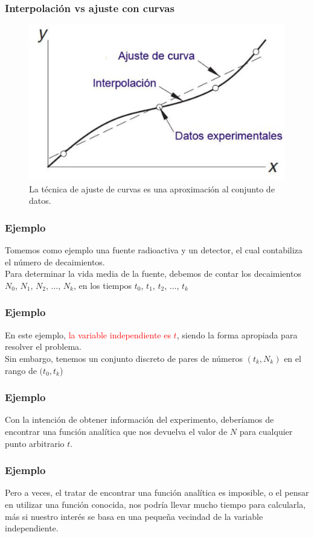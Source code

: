 \begin{frame}[fragile]
\frametitle{Interpolación vs ajuste con curvas}
\begin{figure}
\centering
\includegraphics[scale=0.55]{Imagenes/Interpol03.eps}
\caption{La técnica de ajuste de curvas es una aproximación al conjunto de datos.}
\end{figure}
\end{frame}
\begin{frame}
\frametitle{Ejemplo}
Tomemos como ejemplo una fuente radioactiva y un detector, el cual contabiliza el número de decaimientos.
\\
\bigskip
Para determinar la vida media de la fuente, debemos de contar los decaimientos $N_{0}$, $N_{1}$, $N_{2}$, $\ldots$, $N_{k}$, en los tiempos $t_{0}$, $t_{1}$, $t_{2}$, $\ldots$, $t_{k}$
\end{frame}
\begin{frame}
\frametitle{Ejemplo}
En este ejemplo, \textcolor{red}{la variable independiente es $t$}, siendo la forma  apropiada para resolver el problema. 
\\
\bigskip
Sin embargo, tenemos un conjunto discreto de pares de números $(t_{k},N_{k})$ en el rango de $(t_{0}, t_{k}$)
\end{frame}
\begin{frame}
\frametitle{Ejemplo}
Con la intención de obtener información del experimento, deberíamos de encontrar una función analítica que nos devuelva el valor de $N$ para cualquier punto arbitrario $t$.
\end{frame}
\begin{frame}
\frametitle{Ejemplo}
Pero a veces, el tratar de encontrar una función analítica es imposible, o el pensar en utilizar una función conocida, nos podría llevar mucho tiempo para calcularla, más si nuestro interés se basa en una pequeña vecindad de la variable independiente.
\end{frame}
